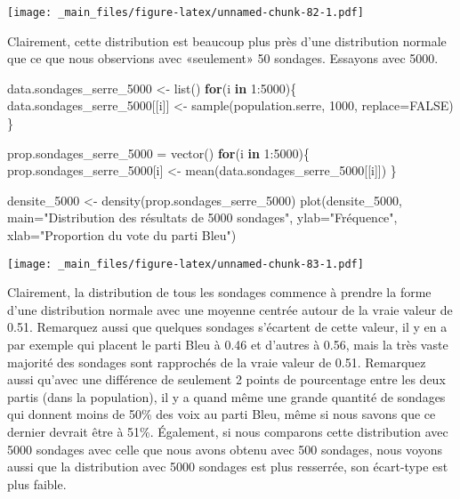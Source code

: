 \documentclass[
]{book}
\newenvironment{Shaded}{\begin{snugshade}}{\end{snugshade}}
\newcommand{\AttributeTok}[1]{\textcolor[rgb]{0.77,0.63,0.00}{#1}}
\newcommand{\ConstantTok}[1]{\textcolor[rgb]{0.00,0.00,0.00}{#1}}
\newcommand{\ControlFlowTok}[1]{\textcolor[rgb]{0.13,0.29,0.53}{\textbf{#1}}}
\newcommand{\DecValTok}[1]{\textcolor[rgb]{0.00,0.00,0.81}{#1}}
\newcommand{\FunctionTok}[1]{\textcolor[rgb]{0.00,0.00,0.00}{#1}}
\newcommand{\NormalTok}[1]{#1}
\newcommand{\OtherTok}[1]{\textcolor[rgb]{0.56,0.35,0.01}{#1}}
\newcommand{\SpecialCharTok}[1]{\textcolor[rgb]{0.00,0.00,0.00}{#1}}
\newcommand{\StringTok}[1]{\textcolor[rgb]{0.31,0.60,0.02}{#1}}
\begin{document}
\texttt{[image: \_main\_files/figure-latex/unnamed-chunk-82-1.pdf]}

Clairement, cette distribution est beaucoup plus près d'une distribution normale que ce que nous observions avec «seulement» 50 sondages. Essayons avec 5000.

\begin{Shaded}
\begin{Highlighting}[]
\NormalTok{data.sondages\_serre\_5000 }\OtherTok{\textless{}{-}} \FunctionTok{list}\NormalTok{()}
\ControlFlowTok{for}\NormalTok{(i }\ControlFlowTok{in} \DecValTok{1}\SpecialCharTok{:}\DecValTok{5000}\NormalTok{)\{ }
\NormalTok{    data.sondages\_serre\_5000[[i]] }\OtherTok{\textless{}{-}} \FunctionTok{sample}\NormalTok{(population.serre, }\DecValTok{1000}\NormalTok{, }\AttributeTok{replace=}\ConstantTok{FALSE}\NormalTok{)}
\NormalTok{\}}

\NormalTok{prop.sondages\_serre\_5000 }\OtherTok{=} \FunctionTok{vector}\NormalTok{()}
\ControlFlowTok{for}\NormalTok{(i }\ControlFlowTok{in} \DecValTok{1}\SpecialCharTok{:}\DecValTok{5000}\NormalTok{)\{}
\NormalTok{    prop.sondages\_serre\_5000[i] }\OtherTok{\textless{}{-}} \FunctionTok{mean}\NormalTok{(data.sondages\_serre\_5000[[i]])}
\NormalTok{\}}

\NormalTok{densite\_5000 }\OtherTok{\textless{}{-}} \FunctionTok{density}\NormalTok{(prop.sondages\_serre\_5000)}
\FunctionTok{plot}\NormalTok{(densite\_5000, }
     \AttributeTok{main=}\StringTok{"Distribution des résultats de 5000 sondages"}\NormalTok{,}
     \AttributeTok{ylab=}\StringTok{"Fréquence"}\NormalTok{,}
     \AttributeTok{xlab=}\StringTok{"Proportion du vote du parti Bleu"}\NormalTok{)}
\end{Highlighting}
\end{Shaded}

\texttt{[image: \_main\_files/figure-latex/unnamed-chunk-83-1.pdf]}

Clairement, la distribution de tous les sondages commence à prendre la forme d'une distribution normale avec une moyenne centrée autour de la vraie valeur de 0.51. Remarquez aussi que quelques sondages s'écartent de cette valeur, il y en a par exemple qui placent le parti Bleu à 0.46 et d'autres à 0.56, mais la très vaste majorité des sondages sont rapprochés de la vraie valeur de 0.51. Remarquez aussi qu'avec une différence de seulement 2 points de pourcentage entre les deux partis (dans la population), il y a quand même une grande quantité de sondages qui donnent moins de 50\% des voix au parti Bleu, même si nous savons que ce dernier devrait être à 51\%. Également, si nous comparons cette distribution avec 5000 sondages avec celle que nous avons obtenu avec 500 sondages, nous voyons aussi que la distribution avec 5000 sondages est plus resserrée, son écart-type est plus faible.
\end{document}
